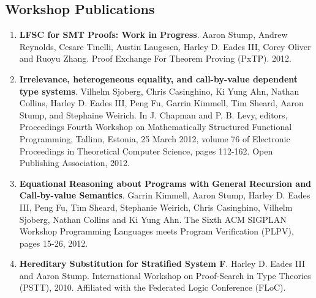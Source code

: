 \documentclass{article}
\begin{document}
  \subsection{Workshop Publications}
  \begin{enumerate}  
    
  \item \textbf{LFSC for SMT Proofs: Work in Progress}.
    Aaron Stump, Andrew Reynolds, Cesare Tinelli, Austin Laugesen, Harley D. Eades III, Corey Oliver and Ruoyu Zhang. 
    Proof Exchange For Theorem Proving (PxTP). 2012.
    
  \item \textbf{Irrelevance, heterogeneous equality, and call-by-value dependent type systems}.
    Vilhelm Sjoberg, Chris Casinghino, Ki Yung Ahn, Nathan Collins, Harley D. Eades III, Peng Fu, Garrin Kimmell, Tim Sheard, Aaron Stump, and Stephaine Weirich.
    In J. Chapman and P. B. Levy, editors, Proceedings Fourth Workshop on Mathematically Structured Functional Programming, Tallinn, 
    Estonia, 25 March 2012, volume 76 of Electronic Proceedings in Theoretical Computer Science, pages 112-162. Open Publishing Association, 2012.
    
  \item \textbf{Equational Reasoning about Programs with General Recursion and Call-by-value Semantics}.
    Garrin Kimmell, Aaron Stump, Harley D. Eades III, Peng Fu, Tim Sheard, Stephanie Weirich, 
    Chris Casinghino, Vilhelm Sjoberg, Nathan Collins and Ki Yung Ahn. 
    The Sixth ACM SIGPLAN Workshop Programming Languages meets Program Verification (PLPV), pages 15-26, 2012. 
    
  \item \textbf{Hereditary Substitution for Stratified System F}. Harley D. Eades III and Aaron Stump. 
    International Workshop on Proof-Search in Type Theories (PSTT), 2010. Affiliated with 
    the Federated Logic Conference (FLoC).
  \end{enumerate}
\end{document}
